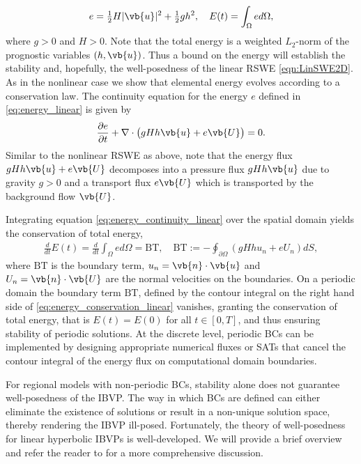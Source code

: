 \documentclass{article}
\numberwithin{equation}{section}
\theoremstyle{definition}
\begin{document}
\begin{equation}\label{eq:energy_linear}
   e=\tfrac{1}{2}H|\vb{u}|^2 + \tfrac{1}{2}gh^2, \quad  E(t) = \int_{\Omega} e d\Omega,
\end{equation}
where $g>0$ and $H>0$. Note that the total energy is a weighted $L_2$-norm of the prognostic variables $(h, \vb{u})$. Thus a bound on the energy will establish the stability and, hopefully, the well-posedness of the linear RSWE \eqref{eqn:LinSWE2D}.
%
As in the nonlinear case we show that elemental energy evolves according to a conservation law.
The continuity equation for the energy $e$ defined in \eqref{eq:energy_linear} is given by
\begin{equation}\label{eq:energy_continuity_linear}
    \frac{\partial e}{\partial t } + \nabla \cdot \big(gHh\vb{u} + e\vb{U}\big) = 0.
\end{equation}
Similar to the nonlinear RSWE  as above, note that  the energy flux $gHh\vb{u} + e\vb{U}$ decomposes into a pressure flux $gHh\vb{u}$ due to gravity $g>0$ and a transport flux $e\vb{U}$ which is transported by the background flow $\vb{U}$.

Integrating equation \eqref{eq:energy_continuity_linear} over the spatial domain yields the conservation of total energy,
\begin{align}\label{eq:energy_conservation_linear}
 \frac{d}{dt}E(t)= \frac{d}{dt}\int_{\Omega} e d\Omega = \mathrm{BT}, \quad \mathrm{BT}:=-\oint_{\partial \Omega} \left(gHh{u}_n + e{U}_n\right) dS, 
\end{align}
where $\mathrm{BT}$ is the boundary term, $u_n = \vb{n}\cdot \vb{u}$ and $U_n = \vb{n}\cdot \vb{U}$ are  the normal velocities on the boundaries. 
On a periodic domain the boundary term $\mathrm{BT}$, defined by the contour integral on the right hand side of \eqref{eq:energy_conservation_linear} vanishes, granting the conservation of total energy, that is $E(t)=E(0)$ for all $t \in [0,T]$, and thus ensuring stability of periodic solutions. At the discrete level, periodic BCs can be implemented by designing appropriate numerical fluxes or SATs that cancel the contour integral of the energy flux on computational domain boundaries. 

For regional models with non-periodic BCs, stability alone does not guarantee well-posedness of the IBVP. The way in which BCs are defined can either eliminate the existence of solutions or result in a non-unique solution space, thereby rendering the IBVP ill-posed. Fortunately, the theory of well-posedness for linear hyperbolic IBVPs is well-developed. We will provide a brief overview and refer the reader to \cite{GHADER20141, gustafsson1995time, nordstrom2022linear} for a more comprehensive discussion.
\end{document}
